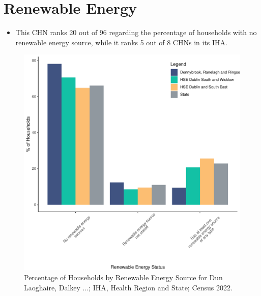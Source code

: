 \documentclass{article}
\begin{document}
\section{Renewable Energy}\label{sect:RE}
\begin{itemize}
\item This CHN ranks  20 out of 96 regarding the percentage of households with no renewable energy source, while it ranks   5 out of 8 CHNs in its IHA.
\end{itemize}
\begin{figure}[H]
	\centering
	\includegraphics[width = 140mm]{../figures/RenewableEnergyED.pdf}
	\caption{Percentage of Households by Renewable Energy Source for Dun Laoghaire, Dalkey ...; IHA, Health Region and State; Census 2022.}
	\label{fig:vbnv}
	\end{figure}
\end{document}
